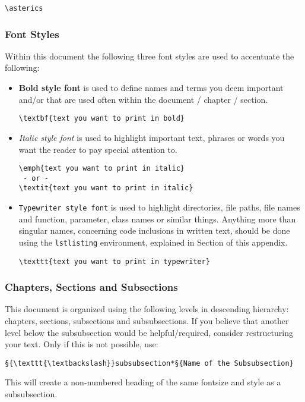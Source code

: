 \begin{lstlisting}[style=LaTeXStyle]
\asterics
\end{lstlisting}

\subsubsection{Font Styles}

Within this document the following three font styles are used to accentuate the following:
\begin{itemize}
\item \textbf{Bold style font} is used to define names and terms you deem important and/or that are used often within the document / chapter / section.
\begin{lstlisting}[style=LaTeXStyle]
\textbf{text you want to print in bold}
\end{lstlisting}

\item \textit{Italic style font} is used to highlight important text, phrases or words you want the reader to pay special attention to.
\begin{lstlisting}[style=LaTeXStyle]
\emph{text you want to print in italic}
 - or - 
\textit{text you want to print in italic}
\end{lstlisting}

\item \texttt{Typewriter style font} is used to highlight directories, file paths, file names and function, parameter, class names or similar things.
Anything more than singular names, concerning code inclusions in written text, should be done using the \texttt{lstlisting} environment, explained in Section  of this appendix.
\begin{lstlisting}[style=LaTeXStyle]
\texttt{text you want to print in typewriter}
\end{lstlisting}
\end{itemize}

\subsubsection{Chapters, Sections and Subsections}

This document is organized using the following levels in descending hierarchy: chapters, sections, subsections and subsubsections.
If you believe that another level below the subsubsection would be helpful/required, consider restructuring your text.
Only if this is not possible, use:
\begin{lstlisting}[style=LaTeXStyle]
§{\texttt{\textbackslash}}subsubsection*§{Name of the Subsubsection}
\end{lstlisting}
This will create a non-numbered heading of the same fontsize and style as a subsubsection.

